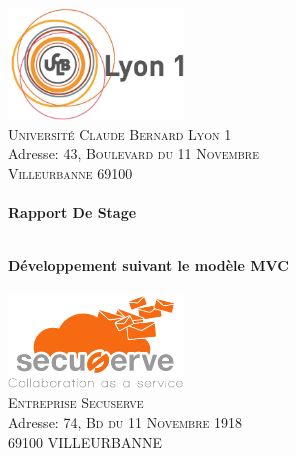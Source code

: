 \begin{titlepage}
\begin{center}

\includegraphics[width=0.35\textwidth]{./logo_lyon1_2.jpg}~\\[0.2cm]

\textsc{\LARGE Université Claude Bernard Lyon 1}\\
Adresse: \textsc{43, Boulevard du 11 Novembre  \\ Villeurbanne 69100}\\[1cm]

\textsc{\Large }\\[0.5cm]

{\huge \bfseries Rapport De Stage\\}

\HRule \\[0.4cm]

{\huge \bfseries Développement suivant le modèle MVC  } \\[0.4cm]

\HRule \\[1.5cm]

\includegraphics[width=0.35\textwidth]{./secuserve_logo.png}~\\[0.2cm]

\textsc{\LARGE Entreprise Secuserve}\\
Adresse: \textsc{74, Bd du 11 Novembre 1918 \\ 69100 VILLEURBANNE}\\[2.5cm]


\end{center}
\end{titlepage}
